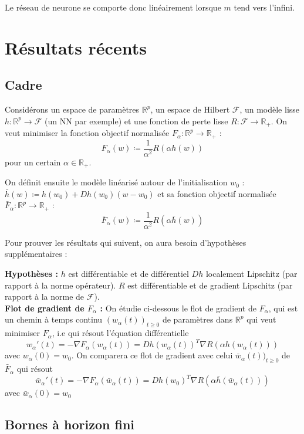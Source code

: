 \documentclass[a4paper, 11pt, french]{article}
\theoremstyle{definition}
\begin{document}
	Le réseau de neurone se comporte donc linéairement lorsque $m$ tend vers l'infini.
	
	\newpage
	
	\section{Résultats récents}
	
	\subsection{Cadre}
	
	Considérons un espace de paramètres $\mathbb{R}^p$, un espace de Hilbert $\mathcal{F}$, un modèle lisse $h : \mathbb{R}^p \to \mathcal{F}$ (un NN par exemple) et une fonction de perte lisse $R : \mathcal{F} \to \mathbb{R}_+$. On veut minimiser la fonction objectif normalisée $F_{\alpha} : \mathbb{R}^p \to \mathbb{R}_+$ : \[F_{\alpha} (w) \coloneqq \frac{1}{\alpha^2} R(\alpha h(w))\] pour un certain $\alpha \in \mathbb{R}_+$.
	
	On définit ensuite le modèle linéarisé autour de l'initialisation $w_0$ : $\bar{h} (w) \coloneqq h(w_0) + Dh(w_0)(w - w_0)$ et sa fonction objectif normalisée $\bar{F}_{\alpha} : \mathbb{R}^p \to \mathbb{R}_+$ : \[\bar{F}_{\alpha} (w) \coloneqq \frac{1}{\alpha^2} R(\alpha \bar{h}(w))\]
	
	Pour prouver les résultats qui suivent, on aura besoin d'hypothèses supplémentaires :
		
	{\bf Hypothèses : } $h$ est différentiable et de différentiel $Dh$ localement Lipschitz (par rapport à la norme opérateur). $R$ est différentiable et de gradient Lipschitz (par rapport à la norme de $\mathcal{F}$). \\
	
	{\bf Flot de gradient de $F_{\alpha}$ : } On étudie ci-dessous le flot de gradient de $F_{\alpha}$, qui est un chemin à temps continu $(w_{\alpha}(t))_{t\geq 0}$ de paramètres dans $\mathbb{R}^p$ qui veut minimiser $F_{\alpha}$, i.e qui résout l'équation différentielle 
	\[w_{\alpha}'(t) = - \nabla F_{\alpha}(w_{\alpha}(t)) = Dh (w_{\alpha}(t))^T \nabla R (\alpha h(w_{\alpha}(t)))\] avec $w_{\alpha}(0) = w_0$. On comparera ce flot de gradient avec celui $\bar{w}_{\alpha}(t))_{t\geq 0}$ de $\bar{F}_{\alpha}$ qui résout
	\[\bar{w}_{\alpha}'(t) = - \nabla F_{\alpha}(\bar{w}_{\alpha}(t)) = Dh (w_0)^T \nabla R (\alpha \bar{h}(\bar{w}_{\alpha}(t)))\] avec $\bar{w}_{\alpha}(0) = w_0$
	
	\subsection{Bornes à horizon fini}
	
\end{document}
